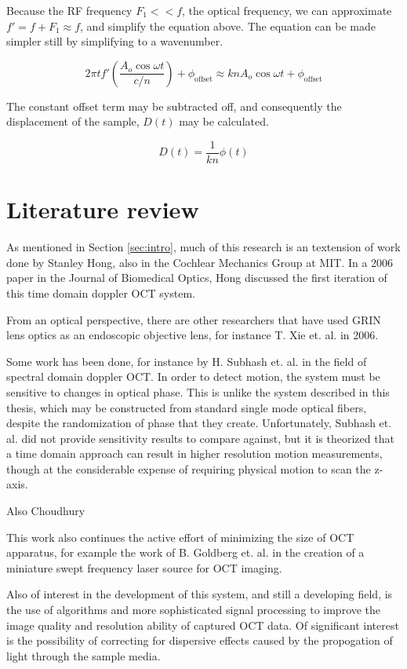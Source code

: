 Because the RF frequency $F_1 << f$, the optical frequency, we can approximate $f' = f + F_1 \approx f$, and simplify the equation above. The equation can be made simpler still by simplifying to a wavenumber.

\begin{equation}
2 \pi t f'  \left( \frac{A_o \cos{\omega t}}{c/n} \right) + \phi_{\mathrm{offset}} \approx k n A_o \cos{\omega t} + \phi_{\mathrm{offset}}
\end{equation}

The constant offset term may be subtracted off, and consequently the displacement of the sample, $D(t)$ may be calculated.


\begin{equation}
D(t) = \frac{1}{kn} \phi(t)
\end{equation}

\section{Literature review}

As mentioned in Section \ref{sec:intro}, much of this research is an textension of work done by Stanley Hong, also in the Cochlear Mechanics Group at MIT. In a 2006 paper in the Journal of Biomedical Optics, Hong discussed the first iteration of this time domain doppler OCT system. \cite{hong}

From an optical perspective, there are other researchers that have used GRIN lens optics as an endoscopic objective lens, for instance T. Xie et. al. in 2006. \cite{Xie2006}


Some work has been done, for instance by H. Subhash et. al. in the field of spectral domain doppler OCT. \cite{Subhash2012} In order to detect motion, the system must be sensitive to changes in optical phase. This is unlike the system described in this thesis, which may be constructed from standard single mode optical fibers, despite the randomization of phase that they create. Unfortunately, Subhash et. al. did not provide sensitivity results to compare against, but it is theorized that a time domain approach can result in higher resolution motion measurements, though at the considerable expense of requiring physical motion to scan the z-axis.

Also Choudhury \cite{Choudhury2011}

This work also continues the active effort of minimizing the size of OCT apparatus, for example the work of B. Goldberg et. al. in the creation of a miniature swept frequency laser source for OCT imaging. \cite{Goldberg2009}

Also of interest in the development of this system, and still a developing field, is the use of algorithms and more sophisticated signal processing to improve the image quality and resolution ability of captured OCT data. Of significant interest is the possibility of correcting for dispersive effects caused by the propogation of light through the sample media. \cite{Xie2005} \cite{DrexlerBook}